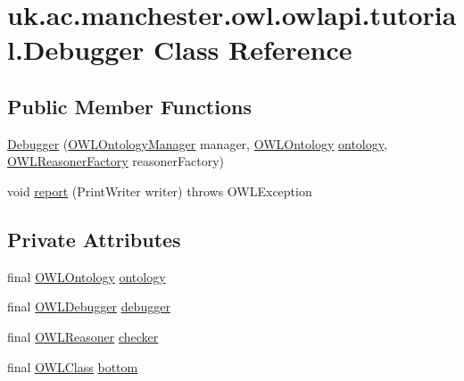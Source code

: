 \hypertarget{classuk_1_1ac_1_1manchester_1_1owl_1_1owlapi_1_1tutorial_1_1_debugger}{\section{uk.\-ac.\-manchester.\-owl.\-owlapi.\-tutorial.\-Debugger Class Reference}
\label{classuk_1_1ac_1_1manchester_1_1owl_1_1owlapi_1_1tutorial_1_1_debugger}
}
\subsection*{Public Member Functions}
\begin{DoxyCompactItemize}
\item 
\hyperlink{classuk_1_1ac_1_1manchester_1_1owl_1_1owlapi_1_1tutorial_1_1_debugger_a227918c2aa2cb96ac9abcdf1f2fdb7e6}{Debugger} (\hyperlink{interfaceorg_1_1semanticweb_1_1owlapi_1_1model_1_1_o_w_l_ontology_manager}{O\-W\-L\-Ontology\-Manager} manager, \hyperlink{interfaceorg_1_1semanticweb_1_1owlapi_1_1model_1_1_o_w_l_ontology}{O\-W\-L\-Ontology} \hyperlink{classuk_1_1ac_1_1manchester_1_1owl_1_1owlapi_1_1tutorial_1_1_debugger_abe5953cbf19fbd3d397e6affdbf5549d}{ontology}, \hyperlink{interfaceorg_1_1semanticweb_1_1owlapi_1_1reasoner_1_1_o_w_l_reasoner_factory}{O\-W\-L\-Reasoner\-Factory} reasoner\-Factory)
\item 
void \hyperlink{classuk_1_1ac_1_1manchester_1_1owl_1_1owlapi_1_1tutorial_1_1_debugger_a9ffdfb6c2f96e85d8582a6b7c0093dd1}{report} (Print\-Writer writer)  throws O\-W\-L\-Exception 
\end{DoxyCompactItemize}
\subsection*{Private Attributes}
\begin{DoxyCompactItemize}
\item 
final \hyperlink{interfaceorg_1_1semanticweb_1_1owlapi_1_1model_1_1_o_w_l_ontology}{O\-W\-L\-Ontology} \hyperlink{classuk_1_1ac_1_1manchester_1_1owl_1_1owlapi_1_1tutorial_1_1_debugger_abe5953cbf19fbd3d397e6affdbf5549d}{ontology}
\item 
final \hyperlink{interfaceorg_1_1semanticweb_1_1owlapi_1_1debugging_1_1_o_w_l_debugger}{O\-W\-L\-Debugger} \hyperlink{classuk_1_1ac_1_1manchester_1_1owl_1_1owlapi_1_1tutorial_1_1_debugger_a1706d3312bff99dff48664f0ecea3e6b}{debugger}
\item 
final \hyperlink{interfaceorg_1_1semanticweb_1_1owlapi_1_1reasoner_1_1_o_w_l_reasoner}{O\-W\-L\-Reasoner} \hyperlink{classuk_1_1ac_1_1manchester_1_1owl_1_1owlapi_1_1tutorial_1_1_debugger_a330a1d7ab3b02b010fdcfbd03c4ff51b}{checker}
\item 
final \hyperlink{interfaceorg_1_1semanticweb_1_1owlapi_1_1model_1_1_o_w_l_class}{O\-W\-L\-Class} \hyperlink{classuk_1_1ac_1_1manchester_1_1owl_1_1owlapi_1_1tutorial_1_1_debugger_af6629b3b3252290ba70bbe5ac098c573}{bottom}
\end{DoxyCompactItemize}


